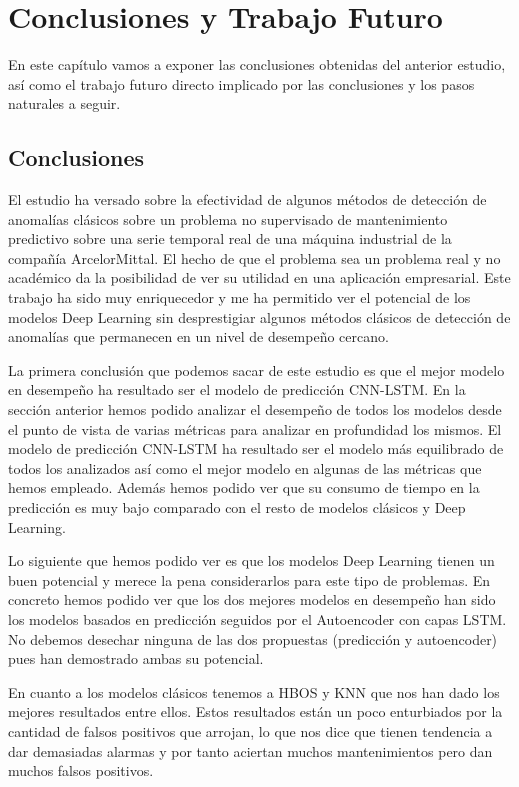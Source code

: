 \chapter{Conclusiones y Trabajo Futuro}
\label{chapter:conclusiones-trabajo-futuro}

En este capítulo vamos a exponer las conclusiones obtenidas del anterior estudio, así como el trabajo futuro directo implicado por las conclusiones y los pasos naturales a seguir.

\section{Conclusiones}

El estudio ha versado sobre la efectividad de algunos métodos de detección de anomalías clásicos sobre un problema no supervisado de mantenimiento predictivo sobre una serie temporal real de una máquina industrial de la compañía ArcelorMittal. El hecho de que el problema sea un problema real y no académico da la posibilidad de ver su utilidad en una aplicación empresarial. Este trabajo ha sido muy enriquecedor y me ha permitido ver el potencial de los modelos Deep Learning sin desprestigiar algunos métodos clásicos de detección de anomalías que permanecen en un nivel de desempeño cercano.

La primera conclusión que podemos sacar de este estudio es que el mejor modelo en desempeño ha resultado ser el modelo de predicción CNN-LSTM. En la sección anterior hemos podido analizar el desempeño de todos los modelos desde el punto de vista de varias métricas para analizar en profundidad los mismos. El modelo de predicción CNN-LSTM ha resultado ser el modelo más equilibrado de todos los analizados así como el mejor modelo en algunas de las métricas que hemos empleado. Además hemos podido ver que su consumo de tiempo en la predicción es muy bajo comparado con el resto de modelos clásicos y Deep Learning.

Lo siguiente que hemos podido ver es que los modelos Deep Learning tienen un buen potencial y merece la pena considerarlos para este tipo de problemas. En concreto hemos podido ver que los dos mejores modelos en desempeño han sido los modelos basados en predicción seguidos por el Autoencoder con capas LSTM. No debemos desechar ninguna de las dos propuestas (predicción y autoencoder) pues han demostrado ambas su potencial.

En cuanto a los modelos clásicos tenemos a HBOS y KNN que nos han dado los mejores resultados entre ellos. Estos resultados están un poco enturbiados por la cantidad de falsos positivos que arrojan, lo que nos dice que tienen tendencia a dar demasiadas alarmas y por tanto aciertan muchos mantenimientos pero dan muchos falsos positivos.

